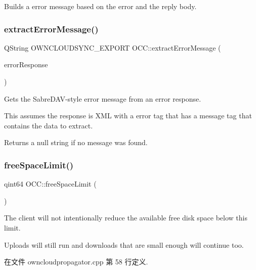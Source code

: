 Builds a error message based on the error and the reply body. \mbox{\label{namespace_o_c_c_aa531e89c99df730480bf0da12d7da153}} 
\subsubsection{\texorpdfstring{extract\+Error\+Message()}{extractErrorMessage()}}
{\footnotesize\ttfamily Q\+String O\+W\+N\+C\+L\+O\+U\+D\+S\+Y\+N\+C\+\_\+\+E\+X\+P\+O\+RT O\+C\+C\+::extract\+Error\+Message (\begin{DoxyParamCaption}\item[{const Q\+Byte\+Array \&}]{error\+Response }\end{DoxyParamCaption})}

Gets the Sabre\+D\+A\+V-\/style error message from an error response.

This assumes the response is X\+ML with a \textquotesingle{}error\textquotesingle{} tag that has a \textquotesingle{}message\textquotesingle{} tag that contains the data to extract.

Returns a null string if no message was found. \mbox{\label{namespace_o_c_c_a1b835a945f7c6d134c20ac26267111fd}} 
\subsubsection{\texorpdfstring{free\+Space\+Limit()}{freeSpaceLimit()}}
{\footnotesize\ttfamily qint64 O\+C\+C\+::free\+Space\+Limit (\begin{DoxyParamCaption}{ }\end{DoxyParamCaption})}

The client will not intentionally reduce the available free disk space below this limit.

Uploads will still run and downloads that are small enough will continue too. 

在文件 owncloudpropagator.\+cpp 第 58 行定义.

\mbox{\label{namespace_o_c_c_a743e89f403e11903735a7507b92169e5}} 

